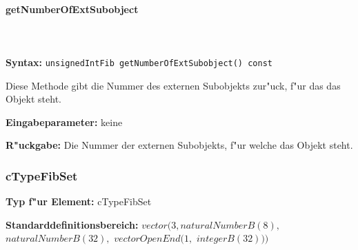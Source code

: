\paragraph{getNumberOfExtSubobject}

\ \\\\\noindent
\textbf{Syntax:} \verb|unsignedIntFib getNumberOfExtSubobject() const|

\bigskip\noindent
Diese Methode gibt die Nummer des externen Subobjekts zur"uck, f"ur das das Objekt steht.

\bigskip\noindent
\textbf{Eingabeparameter:} keine

\bigskip\noindent
\textbf{R"uckgabe:} Die Nummer der externen Subobjekts, f"ur welche das Objekt steht.



% 
% 
% 
% 
% 




\subsubsection{cTypeFibSet}

\textbf{Typ f"ur Element:} cTypeFibSet

\bigskip\noindent
\textbf{Standarddefinitionsbereich:} $vector( 3, naturalNumberB(8),$ $naturalNumberB(32),$ $vectorOpenEnd( 1,$ $integerB(32) ) )$


